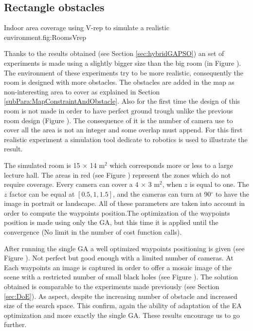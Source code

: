 	\subsection{Rectangle obstacles } \label{sec:expRectObstacle}
	\begin{mfigures}[!]{Indoor area coverage using V-rep to simulate a realistic environment.}{fig:RoomsVrep} \centering
{}
\hspace{1cm}
\hspace{1cm}

\tabsimuposeVrep
\end{mfigures}
	
	Thanks to the results obtained (see  Section \ref{sec:hybridGAPSO}) an  set of experiments is made using a slightly bigger size than the big room (in Figure ). The environment of these experiments try to be more realistic, consequently the room is designed with more obstacles. 
	The obstacles are added in the map as non-interesting area to cover as explained in Section \ref{subPara:MapConstraintAndObstacle}. Also for the first time the design of this room  is  not made in order to have perfect ground trough unlike the previous room design (Figure ). The consequence of it is the number of camera use to cover all the area is not an integer and some overlap must append.
	For this first realistic experiment a simulation tool dedicate to robotics is used to illustrate the result. 
	     
	The simulated room is 15 $\times$ 14 m$^2$ which corresponds more or less to a large lecture hall. The areas in red (see Figure ) represent the zones which do not require coverage. Every camera can cover a 4 $\times$ 3 m$^2$,  when $z$ is equal to one. The $z$ factor can be equal at $[0.5, 1, 1.5]$, and the cameras can turn  at 90$^{\circ}$ to have the image in portrait or landscape. All of these parameters are taken into account in order to compute the waypoints position.The optimization of the waypoints position is made using  only the GA, but this time it is applied until the convergence (No limit in the number of cost function calls). 
	
	 After running the single GA  a well optimized waypoints positioning is given (see Figure ). Not perfect but good enough with a limited number of cameras. At Each waypoints an image is captured in order to offer a  mosaic image of the scene with a restricted number of small black holes (see Figure ).
	  The solution obtained is comparable to the experiments made previously (see Section \ref{sec:DoE}). As aspect, despite the increasing number of obstacle and increased size of the search space. This confirm, again the ability of adaptation of the EA optimization and more exactly the single GA. These results encourage us to go  further. 

